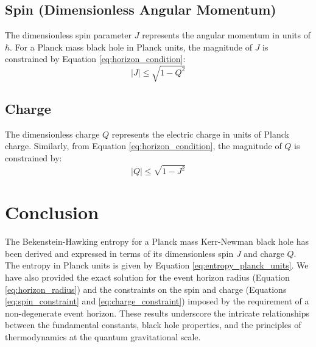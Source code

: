 \documentclass{article}
\begin{document}
	\subsection{Spin (Dimensionless Angular Momentum)}
	
	The dimensionless spin parameter $J$ represents the angular momentum in units of $\hbar$. For a Planck mass black hole in Planck units, the magnitude of $J$ is constrained by Equation \eqref{eq:horizon_condition}:
	\begin{equation}
		|J| \le \sqrt{1 - Q^2}
		\label{eq:spin_constraint}
	\end{equation}
	
	\subsection{Charge}
	
	The dimensionless charge $Q$ represents the electric charge in units of Planck charge. Similarly, from Equation \eqref{eq:horizon_condition}, the magnitude of $Q$ is constrained by:
	\begin{equation}
		|Q| \le \sqrt{1 - J^2}
		\label{eq:charge_constraint}
	\end{equation}
	
	\section{Conclusion}
	
	The Bekenstein-Hawking entropy for a Planck mass Kerr-Newman black hole has been derived and expressed in terms of its dimensionless spin $J$ and charge $Q$. The entropy in Planck units is given by Equation \eqref{eq:entropy_planck_units}. We have also provided the exact solution for the event horizon radius (Equation \eqref{eq:horizon_radius}) and the constraints on the spin and charge (Equations \eqref{eq:spin_constraint} and \eqref{eq:charge_constraint}) imposed by the requirement of a non-degenerate event horizon. These results underscore the intricate relationships between the fundamental constants, black hole properties, and the principles of thermodynamics at the quantum gravitational scale.
	
\end{document}

